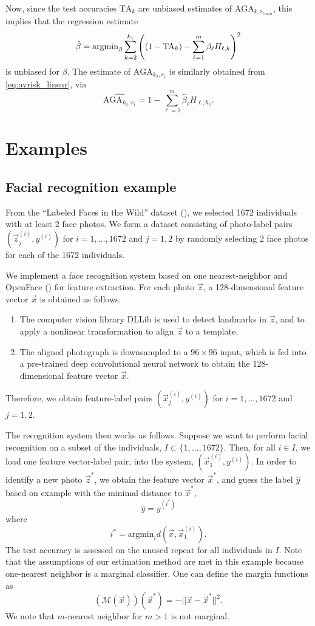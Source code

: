 \documentclass[12pt]{article}
\begin{document}
Now, since the test accuracies $\text{TA}_k$ are unbiased estimates of
$\text{AGA}_{k, r_{train}}$, this implies that the regression
estimate
\[
\hat{\beta} = \text{argmin}_\beta \sum_{k=2}^{k_1} \left( (1 - \text{TA}_k) - \sum_{\ell=1}^m \beta_\ell H_{\ell, k}\right)^2
\]
is unbiased for $\beta$.
The estimate of $\text{AGA}_{k_2,r_1}$ is similarly obtained
from \eqref{eq:avrisk_linear}, via
\begin{equation}\label{eq:avrisk_hat}
\widehat{\text{AGA}_{k_2,r_1}} = 1 - \sum_{\ell=1}^m \hat{\beta}_\ell H_{\ell, k_2}.
\end{equation}

\section{Examples}\label{sec:extrapolation_example}

\subsection{Facial recognition example}

From the ``Labeled Faces in the Wild'' dataset (\cite{LFWTech}), we
selected 1672 individuals with at least 2 face photos.  We form a
dataset consisting of photo-label pairs $(\vec{z}_j^{(i)}, y^{(i)})$
for $i = 1,\hdots, 1672$ and $j = 1,2$ by randomly selecting 2 face
photos for each of the 1672 individuals.

We implement a face recognition system based on one nearest-neighbor
and OpenFace (\cite{amos2016openface}) for feature extraction.  For
each photo $\vec{z}$, a 128-dimensional feature vector $\vec{x}$ is
obtained as follows.
\begin{enumerate}
\item The computer vision library DLLib is used to detect landmarks in
  $\vec{z}$, and to apply a nonlinear transformation to align
  $\vec{z}$ to a template.
\item The aligned photograph is downsampled to a $96 \times 96$ input,
  which is fed into a pre-trained deep convolutional neural network to
  obtain the 128-dimensional feature vector $\vec{x}$.
\end{enumerate}
Therefore, we obtain feature-label pairs $(\vec{x}_j^{(i)}, y^{(i)})$
for $i = 1,\hdots, 1672$ and $j = 1,2$.

The recognition system then works as follows.  Suppose we want to
perform facial recognition on a subset of the individuals, $I \subset
\{1,\hdots, 1672\}$.  Then, for all $i \in I$, we load one feature
vector-label pair, into the system, $(\vec{x}_1^{(i)}, y^{(i)})$.  In
order to identify a new photo $\vec{z}^*$, we obtain the feature
vector $\vec{x}^*$, and guess the label $\hat{y}$ based on example
with the minimal distance to $\vec{x}^*$,
\[
\hat{y} = y^{(i^*)}
\]
where
\[
i^* = \text{argmin}_i d(\vec{x}, \vec{x}_1^{(i)}).
\]
The test accuracy is assessed on the unused repeat for all individuals
in $I$.  Note that the assumptions of our estimation method are met in
this example because one-nearest neighbor is a marginal classifier.
One can define the margin functions as
\[
(\mathcal{M}(\vec{x}))(\vec{x}^*) = -||\vec{x} - \vec{x}^*||^2.
\]
We note that $m$-nearest neighbor for $m > 1$ is not marginal.
\end{document}
